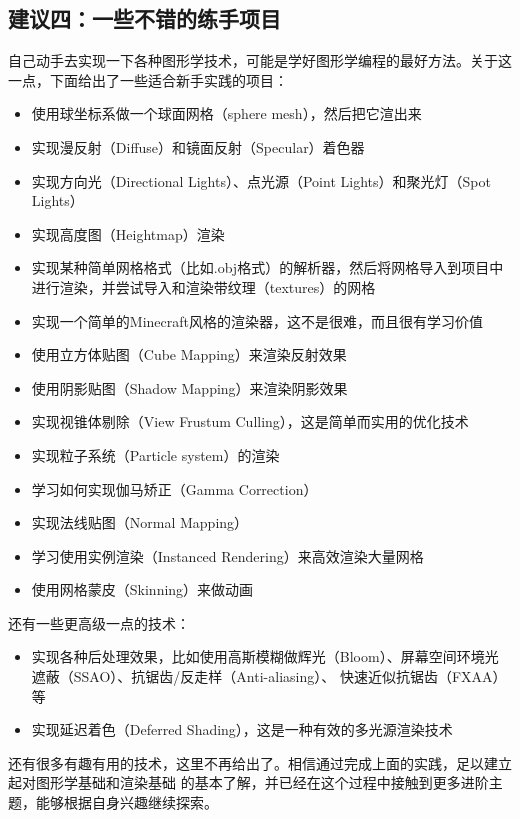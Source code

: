 \documentclass[12pt]{article}
\begin{document}
\subsection*{建议四：一些不错的练手项目}
\indent{}自己动手去实现一下各种图形学技术，可能是学好图形学编程的最好方法。关于这一点，下面给出了一些适合新手实践的项目：
\begin{itemize}
\item 使用球坐标系做一个球面网格（sphere mesh），然后把它渲出来
\item 实现漫反射（Diffuse）和镜面反射（Specular）着色器
\item 实现方向光（Directional Lights）、点光源（Point Lights）和聚光灯（Spot Lights）
\item 实现高度图（Heightmap）渲染
\item 实现某种简单网格格式（比如.obj格式）的解析器，然后将网格导入到项目中进行渲染，并尝试导入和渲染带纹理（textures）的网格
\item 实现一个简单的Minecraft风格的渲染器，这不是很难，而且很有学习价值
\item 使用立方体贴图（Cube Mapping）来渲染反射效果
\item 使用阴影贴图（Shadow Mapping）来渲染阴影效果
\item 实现视锥体剔除（View Frustum Culling），这是简单而实用的优化技术
\item 实现粒子系统（Particle system）的渲染
\item 学习如何实现伽马矫正（Gamma Correction）
\item 实现法线贴图（Normal Mapping）
\item 学习使用实例渲染（Instanced Rendering）来高效渲染大量网格
\item 使用网格蒙皮（Skinning）来做动画
\end{itemize}
\noindent{}还有一些更高级一点的技术：
\begin{itemize}
\item 实现各种后处理效果，比如使用高斯模糊做辉光（Bloom）、屏幕空间环境光遮蔽（SSAO）、抗锯齿/反走样（Anti-aliasing）、
快速近似抗锯齿（FXAA）等
\item 实现延迟着色（Deferred Shading），这是一种有效的多光源渲染技术
\end{itemize}

\indent{}还有很多有趣有用的技术，这里不再给出了。相信通过完成上面的实践，足以建立起对图形学基础和渲染基础
的基本了解，并已经在这个过程中接触到更多进阶主题，能够根据自身兴趣继续探索。
\end{document}
